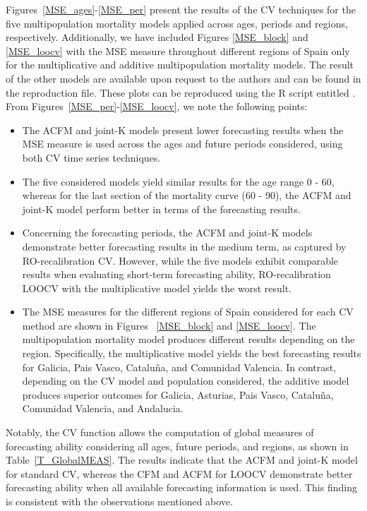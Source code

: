 Figures~\ref{MSE_ages}-\ref{MSE_per} present the results of the CV techniques for the five multipopulation mortality models applied across ages, periods and regions, respectively. Additionally, we have included Figures \ref{MSE_block} and \ref{MSE_loocv} with the MSE measure throughout different regions of Spain only for the multiplicative and additive multipopulation mortality models. The result of the other models are available upon request to the authors and can be found in the reproduction file. These plots can be reproduced using the R script entitled . From Figures~\ref{MSE_per}-\ref{MSE_loocv}, we note the following points:
\begin{itemize}
\item The ACFM and joint-K models present lower forecasting results when the MSE measure is used across the ages and future periods considered, using both CV time series techniques.
\item The five considered models yield similar results for the age range 0 - 60, whereas for the last section of the mortality curve (60 - 90), the ACFM and joint-K model perform better in terms of the forecasting results.
\item Concerning the forecasting periods, the ACFM and joint-K models demonstrate better forecasting results in the medium term, as captured by RO-recalibration CV. However, while the five models exhibit comparable results when evaluating short-term forecasting ability, RO-recalibration LOOCV with the multiplicative model yields the worst result.
\item The MSE measures for the different regions of Spain considered for each CV method are shown in Figures~ \ref{MSE_block} and \ref{MSE_loocv}. The multipopulation mortality model produces different results depending on the region. Specifically, the multiplicative model yields the best forecasting results for Galicia, Pais Vasco, Catalu\~{n}a, and Comunidad Valencia. In contrast, depending on the CV model and population considered, the additive model produces superior outcomes for Galicia, Asturias, Pais Vasco, Catalu\~{n}a, Comunidad Valencia, and Andalucia.
\end{itemize}

Notably, the CV function allows the computation of global measures of forecasting ability considering all ages, future periods, and regions, as shown in Table~\ref{T_GlobalMEAS}. The results indicate that the ACFM and joint-K model for standard CV, whereas the CFM and ACFM for LOOCV demonstrate better forecasting ability when all available forecasting information is used. This finding is consistent with the observations mentioned above.

